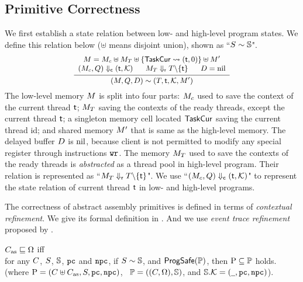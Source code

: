 % 
\subsection{Primitive Correctness}
\label{subsec:correctness-primitive}

We first establish a state relation
between low- and high-level program states.
We define this relation below 
($\uplus$ means disjoint union), shown as
``${S} \sim {\mathbb{S}}$".
\[
    \small
    \infer
    {
        \stateRel{(\Mem, \Rstate, \DBuf)}
            {(\thrdpool, \thrdid, \hthrdlocalst, \Mem')}
    }
    {
        \begin{array}{c}
            \Mem = \Mem_c \uplus \Mem_T \uplus
                \{ \TaskCur \rightsquigarrow (\thrdid, 0) \}
                \uplus \Mem' \\
            \curStRel{(\Mem_c, \Rstate)}{(\thrdid, \hthrdlocalst)}
            \quad \ \
            \rdyStRel{\Mem_T}{\thrdpool \backslash \{ \thrdid \}}
            \quad \ \
            \DBuf = \nil
        \end{array}
    }
\]
The low-level memory $M$ is split into four parts:
$M_c$ used to save the context of the current thread $\textsf{t}$;
$M_T$ saving the contexts of the ready threads,
except the current thread $\textsf{t}$; a singleton memory
cell located $\mathsf{TaskCur}$ saving the current thread id; and shared
memory $M'$ that is same as the high-level memory.
The delayed buffer $D$ is $\text{nil}$, because client
is not permitted to modify any special register
through instructions $\texttt{wr}{}$. The memory $M_T$ used to
save the contexts of the ready threads is {\it abstracted} as a thread pool
in high-level program. Their relation is represented as
``${M_T} \Downarrow_{\textsf{r}} {T \backslash \{ \textsf{t} \}}$".
We use ``${(M_c, Q)} \Downarrow_{\textsf{c}} {(\textsf{t}, \mathcal{K})}$"
to represent the state relation of current thread $\textsf{t}$
in low- and high-level programs.

The correctness of abstract assembly primitives
is defined in terms of {\it contextual refinement}.
We give its formal definition in
\Def{\ref{def:prim-correctness}}.
And we use {\it event trace refinement}
proposed by \etal{Liang} \cite{liang14lics}.

\begin{definition}
    \label{def:prim-correctness}
    {\em $C_{\text{as}} \sqsubseteq \Omega$} iff  \\
    for any {\em $C$}, {\em $S$}, {\em $\mathbb{S}$}, 
    {\em $\texttt{pc}$} and {\em $\texttt{npc}$}, if
    {\em ${S} \sim {\mathbb{S}}$}, and {\em $\textsf{ProgSafe}(\mathbb{P})$},
    then {\em $\text{P} \subseteq \mathbb{P}$} holds.
    (where {\em $\text{P} = (C \uplus C_{\text{as}}, S, \texttt{pc}, \texttt{npc})$}, \,
        {\em $\mathbb{P} = ((C, \Omega), \mathbb{S})$}, and
        {\em $\mathbb{S}.\mathcal{K} = (\underline{\ \,}, \texttt{pc}, \texttt{npc})$}).
\end{definition}

